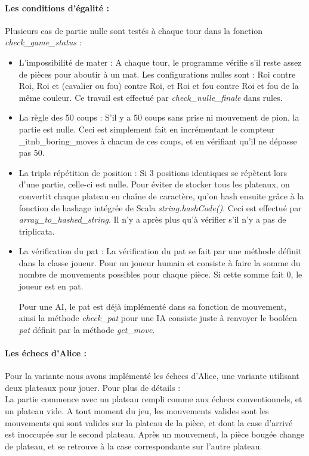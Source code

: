 \documentclass[a4paper]{article}
\begin{document}
\paragraph{Les conditions d'égalité :} Plusieurs cas de partie nulle sont testés à chaque tour dans la fonction \textit{check\_game\_status} : 
\begin{itemize}
\item L'impossibilité de mater : A chaque tour, le programme vérifie s'il reste assez de pièces pour aboutir à un mat. Les configurations nulles sont : Roi contre Roi, Roi et (cavalier ou fou) contre Roi, et Roi et fou contre Roi et fou de la même couleur. Ce travail est effectué par \textit{check\_nulle\_finale} dans rules.

\item La règle des 50 coups : S'il y a 50 coups sans prise ni mouvement de pion, la partie est nulle. Ceci est simplement fait en incrémentant le compteur \text\_it{nb\_boring\_moves} à chacun de ces coups, et en vérifiant qu'il ne dépasse pas 50.

\item La triple répétition de position : Si 3 positions identiques se répètent lors d'une partie, celle-ci est nulle. Pour éviter de stocker tous les plateaux, on convertit chaque plateau en chaîne de caractère, qu'on hash ensuite grâce à la fonction de hashage intégrée de Scala \textit{string.hashCode()}. Ceci est effectué par \textit{array\_to\_hashed\_string}. Il n'y a après plus qu'à vérifier s'il n'y a pas de triplicata.

\item La vérification du pat : La vérification du pat se fait par une méthode définit dans la classe joueur. Pour un joueur humain et consiste à faire la somme du nombre de mouvements possibles pour chaque pièce. Si cette somme fait 0, le joueur est en pat. 

Pour une AI, le pat est déjà implémenté dans sa fonction de mouvement, ainsi la méthode \textit{check\_pat} pour une IA consiste juste à renvoyer le booléen \textit{pat} définit par la méthode \textit{get\_move}. 
\end{itemize} 

\paragraph{Les échecs d'Alice :}Pour la variante nous avons implémenté les échecs d'Alice, une variante utilisant deux plateaux pour jouer. Pour plus de détails : \\
La partie commence avec un plateau rempli comme aux échecs conventionnels, et un plateau vide. A tout moment du jeu, les mouvements valides sont les mouvements qui sont valides sur la plateau de la pièce, et dont la case d'arrivé est inoccupée sur le second plateau. Après un mouvement, la pièce bougée change de plateau, et se retrouve à la case correspondante sur l'autre plateau.\\
\end{document}
